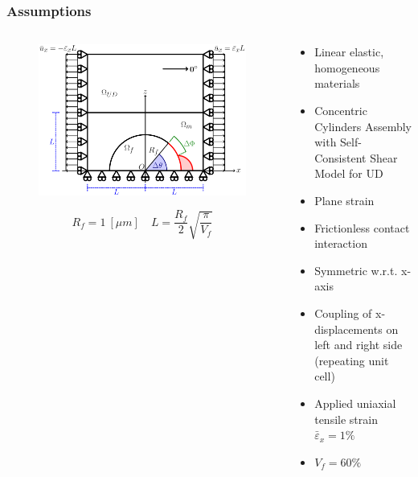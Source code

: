 \documentclass[first,firstsupp,lastsupp,last,hyperref,table]{ETHclass}
\begin{document}
\begin{frame}
\frametitle{\vspace{0.2cm}\small Assumptions}
\vspace{-0.75cm}
\centering
\begin{columns}
\begin{column}{0.5\textwidth}
\begin{figure}
\includegraphics[width=\columnwidth]{RUC.pdf}
\end{figure}
\vspace{-0.1cm}
\tiny
\begin{equation*}
R_{f}=1\ \left[\mu m\right]\quad L=\frac{R_{f}}{2}\sqrt{\frac{\pi}{V_{f}}}
\end{equation*}
\end{column}
\begin{column}{0.5\textwidth}
\scriptsize
\begin{itemize}[label=]
\item Linear elastic, homogeneous materials
\item Concentric Cylinders Assembly with Self-Consistent Shear Model for UD
\item Plane strain
\item Frictionless contact interaction
\item Symmetric w.r.t. x-axis
\item Coupling of x-displacements on left and right side (repeating unit cell)
\item Applied uniaxial tensile strain $\bar{\varepsilon}_{x}=1\%$
\item $V_{f}=60\%$
\end{itemize}
\end{column}

\end{columns}
\end{frame}
\end{document}
